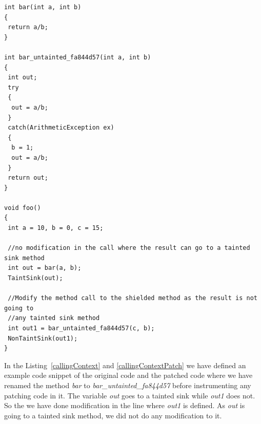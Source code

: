 \begin{lstlisting}
int bar(int a, int b)
{
 return a/b;
}

int bar_untainted_fa844d57(int a, int b)
{
 int out;
 try
 {
  out = a/b;
 }
 catch(ArithmeticException ex)
 {
  b = 1;
  out = a/b;
 }
 return out;
}

void foo()
{
 int a = 10, b = 0, c = 15;
 
 //no modification in the call where the result can go to a tainted sink method
 int out = bar(a, b);
 TaintSink(out);
 
 //Modify the method call to the shielded method as the result is not going to
 //any tainted sink method 
 int out1 = bar_untainted_fa844d57(c, b);
 NonTaintSink(out1);
}

\end{lstlisting}


\doublespacing

In the Listing~\ref{callingContext} and \ref{callingContextPatch} we have
defined an example code snippet of the original code and the patched code where
we have renamed the method \emph{bar} to \emph{bar\_untainted\_fa844d57}
before instrumenting any patching code in it. The variable \emph{out} goes to a
tainted sink while \emph{out1} does not. So the we have done modification in the
line where \emph{out1} is defined. As \emph{out} is going to a tainted sink
method, we did not do any modification to it.




